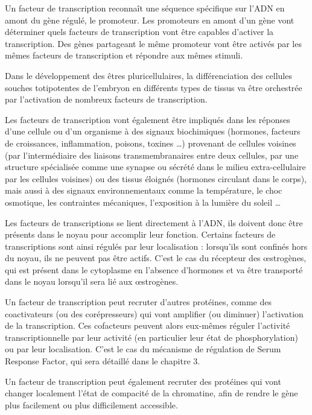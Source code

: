 Un facteur de transcription reconnaît une séquence spécifique sur l'ADN en amont du gène régulé, le promoteur. Les promoteurs en amont d'un gène vont déterminer quels facteurs de transcription vont être capables d'activer la transcription. Des gènes partageant le même promoteur vont être activés par les mêmes facteurs de transcription et répondre aux mêmes stimuli.  

Dans le développement des êtres pluricellulaires, la différenciation des cellules souches totipotentes de l'embryon en différents types de tissus va être orchestrée par l'activation de nombreux facteurs de transcription. 

Les facteurs de transcription vont également être impliqués dans les réponses d'une cellule ou d'un organisme à des signaux biochimiques (hormones, facteurs de croissances, inflammation, poisons, toxines \dots) provenant de cellules voisines (par l'intermédiaire des liaisons transmembranaires entre deux cellules, par une structure spécialisée comme une synapse ou sécrété dans le milieu extra-cellulaire par les cellules voisines) ou des tissus éloignés (hormones circulant dans le corps), mais aussi à des signaux environnementaux comme la température, le choc osmotique, les contraintes mécaniques, l'exposition à la lumière du soleil  \dots

Les facteurs de transcriptions se lient directement à l'ADN, ils doivent donc être présents dans le noyau pour accomplir leur fonction. Certains facteurs de transcriptions sont ainsi régulés par leur localisation : lorsqu'ils sont confinés hors du noyau, ils ne peuvent pas être actifs. C'est le cas du récepteur des \oe{}strogènes, qui est présent dans le cytoplasme en l'absence d'hormones et va être transporté dans le noyau lorsqu'il sera lié aux \oe{}strogènes.

Un facteur de transcription peut recruter d'autres protéines, comme des coactivateurs (ou des corépresseurs) qui vont amplifier (ou diminuer) l'activation de la transcription. Ces cofacteurs peuvent alors eux-mêmes réguler l'activité transcriptionnelle par leur activité (en particulier leur état de phosphorylation) ou par leur localisation. C'est le cas du mécanisme de régulation de Serum Response Factor, qui sera détaillé dans le chapitre 3. 

Un facteur de transcription peut également recruter des protéines qui vont changer localement l'état de compacité de la chromatine, afin de rendre le gène plus facilement ou plus difficilement accessible. 



%
